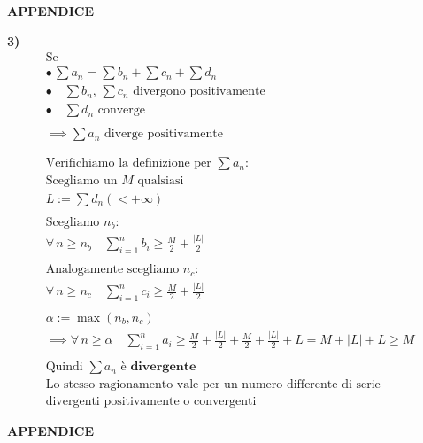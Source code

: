 \documentclass[11pt,reqno]{amsart}
\begin{document}
\newpage
\centerline{\bf APPENDICE }
\bigskip

{\bf 3)}
\begin{gather*}
  \text{Se }\\
  \bullet \,\sum a_n = \sum b_n + \sum c_n + \sum d_n\\
  \bullet \quad \sum b_n, \, \sum c_n \text{ divergono positivamente}\\
  \bullet \quad \sum d_n \text{ converge}\\\\
  \implies \sum a_n \text{ diverge positivamente}\\\\\\
  \text{Verifichiamo la definizione per } \sum a_n:\\
  \text{Scegliamo un } M \text{ qualsiasi}\\
  L := \sum d_n (< +\infty)\\\\
  \text{Scegliamo } n_b:\\
  \forall \, n \geq n_b \quad \sum_{i=1}^{n} b_i \geq \frac{M}{2} + \frac{|L|}{2}\\\\
  \text{Analogamente scegliamo } n_c:\\
  \forall \, n \geq n_c \quad \sum_{i=1}^{n} c_i \geq \frac{M}{2} + \frac{|L|}{2}\\\\
  \alpha := \max{(n_b, n_c)}\\
  \implies \forall \, n \geq \alpha \quad \sum_{i=1}^{n} a_i \geq \frac{M}{2} + \frac{|L|}{2} + \frac{M}{2} + \frac{|L|}{2} + L = M + |L| + L \geq M\\\\
  \text{Quindi } \sum a_n \text{ è } \textbf{divergente}\\
  \text{Lo stesso ragionamento vale per un numero differente di serie}\\
  \text{divergenti positivamente o convergenti}
\end{gather*}

\newpage
\centerline{\bf APPENDICE }
\bigskip
\end{document}
